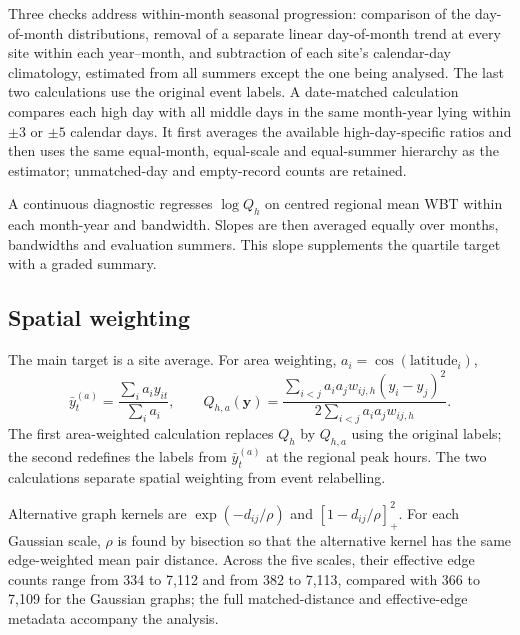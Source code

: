 Three checks address within-month seasonal progression: comparison of the
day-of-month distributions, removal of a separate
linear day-of-month trend at every site within each year--month, and
subtraction of each site's calendar-day climatology, estimated from all
summers except the one being analysed. The last two calculations use the
original event labels.
A date-matched calculation compares each high day with
all middle days in the same month-year lying within $\pm3$ or $\pm5$ calendar
days. It first averages the available high-day-specific ratios and then uses
the same equal-month, equal-scale and equal-summer hierarchy as the
estimator; unmatched-day and empty-record counts are retained.

A continuous diagnostic regresses $\log Q_h$ on centred regional
mean WBT within each month-year and bandwidth. Slopes are then averaged equally
over months, bandwidths and evaluation summers. This slope supplements the
quartile target with a graded summary.


\subsection{Spatial weighting}

The main target is a site average. For area weighting,
$a_i=\cos(\mathrm{latitude}_i)$,
\[
 \bar y_t^{(a)}=\frac{\sum_i a_i y_{it}}{\sum_i a_i},\qquad
 Q_{h,a}(\mathbf y)=
 \frac{\sum_{i<j}a_i a_j w_{ij,h}(y_i-y_j)^2}
      {2\sum_{i<j}a_i a_j w_{ij,h}}.
\]
The first area-weighted calculation replaces $Q_h$ by $Q_{h,a}$ using the
original labels; the second redefines the labels from $\bar y_t^{(a)}$ at the
regional peak hours.
The two calculations separate spatial weighting from event relabelling.


Alternative graph kernels are $\exp(-d_{ij}/\rho)$ and
$[1-d_{ij}/\rho]_+^2$. For each Gaussian scale, $\rho$ is found by bisection so
that the alternative kernel has the same edge-weighted mean pair distance.
Across the five scales, their effective edge counts range from 334 to 7,112
and from 382 to 7,113, compared with 366 to 7,109 for the Gaussian graphs;
the full matched-distance and effective-edge metadata accompany the analysis.
